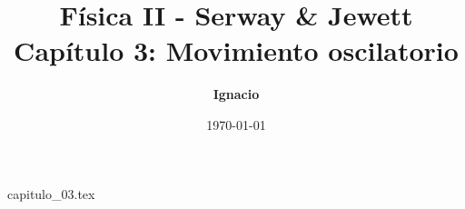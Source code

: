 \documentclass[11pt,spanish,oneside]{report}
\title{\textbf{Física II - Serway \& Jewett} \\ \Large Capítulo 3: Movimiento oscilatorio}
\author{\textbf{Ignacio}}
\date{\today}
\begin{document}
\maketitle

{capitulo_03.tex}
\end{document}
